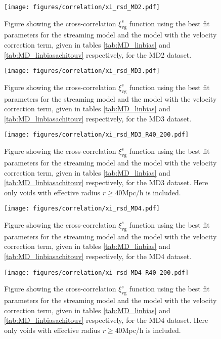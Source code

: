 \begin{figure}[htbp]
    \texttt{[image: figures/correlation/xi\_rsd\_MD2.pdf]}
    \caption{Figure showing the cross-correlation $\xi^{s}_{\mathrm{vg}}$ function using the best fit parameters for the streaming model and the model with the velocity correction term, given in tables \ref{tab:MD_linbias} and \ref{tab:MD_linbiasachitouv} respectively, for the MD2 dataset.}
    \label{fig:xiMD2}
\end{figure}

\begin{figure}[htbp]
    \texttt{[image: figures/correlation/xi\_rsd\_MD3.pdf]}
    \caption{Figure showing the cross-correlation $\xi^{s}_{\mathrm{vg}}$ function using the best fit parameters for the streaming model and the model with the velocity correction term, given in tables \ref{tab:MD_linbias} and \ref{tab:MD_linbiasachitouv} respectively, for the MD3 dataset.}
    \label{fig:xiMD3}
\end{figure}

\begin{figure}[htbp]
    \texttt{[image: figures/correlation/xi\_rsd\_MD3\_R40\_200.pdf]}
    \caption{Figure showing the cross-correlation $\xi^{s}_{\mathrm{vg}}$ function using the best fit parameters for the streaming model and the model with the velocity correction term, given in tables \ref{tab:MD_linbias} and \ref{tab:MD_linbiasachitouv} respectively, for the MD3 dataset. Here only voids with effective radius $r\geq 40$Mpc/h is included.}
    \label{fig:xiMD3R40}
\end{figure}

\begin{figure}[htbp]
    \texttt{[image: figures/correlation/xi\_rsd\_MD4.pdf]}
    \caption{Figure showing the cross-correlation $\xi^{s}_{\mathrm{vg}}$ function using the best fit parameters for the streaming model and the model with the velocity correction term, given in tables \ref{tab:MD_linbias} and \ref{tab:MD_linbiasachitouv} respectively, for the MD4 dataset.}
    \label{fig:xiMD4}
\end{figure}

\begin{figure}[htbp]
    \texttt{[image: figures/correlation/xi\_rsd\_MD4\_R40\_200.pdf]}
    \caption{Figure showing the cross-correlation $\xi^{s}_{\mathrm{vg}}$ function using the best fit parameters for the streaming model and the model with the velocity correction term, given in tables \ref{tab:MD_linbias} and \ref{tab:MD_linbiasachitouv} respectively, for the MD4 dataset. Here only voids with effective radius $r\geq 40$Mpc/h is included.}
    \label{fig:xiMD4R40}
\end{figure}

